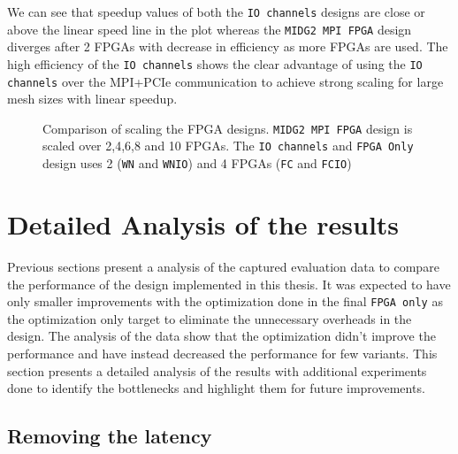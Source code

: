 We can see that speedup values of both the \texttt{IO channels} designs are close or above the
linear speed line in the plot whereas the \texttt{MIDG2 MPI FPGA} design diverges after 2 FPGAs with
decrease in efficiency as more FPGAs are used. The high efficiency of the \texttt{IO channels}
shows the clear advantage of using the \texttt{IO channels} over the MPI+PCIe communication
to achieve strong scaling for large mesh sizes with linear speedup.

\begin{figure}[h]
	\centering\small
    \scalebox{0.8}{}
    \caption{Comparison of scaling the FPGA designs. \texttt{MIDG2 MPI FPGA} design is scaled
    over 2,4,6,8 and 10 FPGAs. The \texttt{IO channels} and \texttt{FPGA Only} design uses
    2 (\texttt{WN} and \texttt{WNIO}) and 4 FPGAs (\texttt{FC} and \texttt{FCIO})}
	\label{plot:speed_gen}
\end{figure}


\section{Detailed Analysis of the results}
\label{sec:analysis}

Previous sections present a analysis of the captured evaluation data to compare
the performance of the design implemented in this thesis. It was expected to
have only smaller improvements with the optimization done in the final
\texttt{FPGA only} as the optimization only target to eliminate the unnecessary
overheads in the design. The analysis of the data show that the optimization didn't
improve the performance and have instead decreased the performance for few variants.
This section presents a detailed analysis of the results with additional experiments
done to identify the bottlenecks and highlight them for future improvements.


\subsection{Removing the latency}

